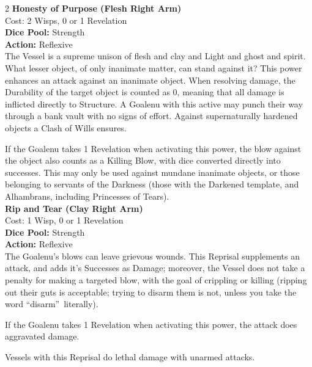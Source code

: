 \begin{multicols}{2}
\noindent\textbf{Honesty of Purpose (Flesh Right Arm)}\\

\noindent Cost: 2 Wisps, 0 or 1 Revelation\\

\noindent\textbf{Dice Pool:} Strength\\

\noindent\textbf{Action:} Reflexive\\

\noindent The Vessel is a supreme unison of flesh and clay and Light and ghost and spirit. What lesser object, of only inanimate matter, can stand against it? This power enhances an attack against an inanimate object. When resolving damage, the Durability of the target object is counted as 0, meaning that all damage is inflicted directly to Structure. A Goalenu with this active may punch their way through a bank vault with no signs of effort. Against supernaturally hardened objects a Clash of Wills ensures. 

If the Goalenu takes 1 Revelation when activating this power, the blow against the object also counts as a Killing Blow, with dice converted directly into successes. This may only be used against mundane inanimate objects, or those belonging to servants of the Darkness (those with the Darkened template, and Alhambrans, including Princesses of Tears).\\

\noindent\textbf{Rip and Tear (Clay Right Arm)}\\

\noindent Cost: 1 Wisp, 0 or 1 Revelation\\

\noindent\textbf{Dice Pool:} Strength\\

\noindent\textbf{Action:} Reflexive\\

\noindent The Goalenu's blows can leave grievous wounds. This Reprisal supplements an attack, and adds it's Successes as Damage; moreover, the Vessel does not take a penalty for making a targeted blow, with the goal of crippling or killing (ripping out their guts is acceptable; trying to disarm them is not, unless you take the word \textquotedblleft disarm\textquotedblright\, literally).

If the Goalenu takes 1 Revelation when activating this power, the attack does aggravated damage.

Vessels with this Reprisal do lethal damage with unarmed attacks.\\


\end{multicols}
